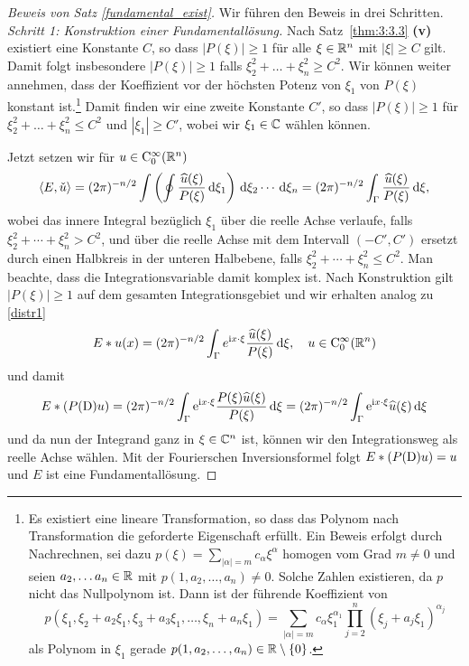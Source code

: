 \begin{proof}[Beweis von Satz \ref{fundamental_exist}]
Wir führen den Beweis in drei Schritten.\\
\noindent
{\em Schritt 1: Konstruktion einer Fundamentallösung.}
Nach Satz~\ref{thm:3:3.3} {\bf (v)} existiert eine Konstante $C$, so dass $|P(\xi)|\ge 1$ für alle $\xi\in \mathbb R^n$ mit $|\xi|\ge C$ gilt.  Damit folgt insbesondere 
$|P(\xi)|\ge 1$ falls $\xi_2^2+ \dots + \xi_n^2 \ge C^2$.  
Wir können weiter annehmen, dass der Koeffizient vor der höchsten Potenz von $\xi_1$ von $P(\xi)$ konstant ist.\footnote{Es existiert eine lineare Transformation, so dass das Polynom nach Transformation die geforderte Eigenschaft erfüllt. Ein Beweis erfolgt durch Nachrechnen, sei dazu $p(\xi)=\sum_{|\alpha|=m}c_\alpha \xi^\alpha$ homogen vom Grad $m\ne0$ und seien $a_2,\ldots a_{n}\in\mathbb R$ mit  $p(1,a_2,\ldots,a_n)\ne0$. Solche Zahlen existieren, da $p$ nicht das Nullpolynom ist. Dann ist der führende Koeffizient von
\[ p(\xi_1, \xi_2+a_2\xi_1, \xi_3+a_3\xi_1,\ldots,\xi_{n}+a_n\xi_1) =\sum_{|\alpha|=m} c_\alpha \xi_1^{\alpha_1} \prod_{j=2}^n  (\xi_j+a_j\xi_1)^{\alpha_j} \]
als Polynom in $\xi_1$ gerade $p(1,a_2,\ldots,a_n)\in\mathbb R\setminus\{0\}$.}
Damit finden wir eine zweite Konstante $C'$, so dass $|P(\xi)|\ge 1$ für $\xi_2^2+\dots + \xi_n^2\le C^2$ und $|\xi_1|\ge C'$, wobei wir $\xi_1\in\mathbb C$ wählen können.  

Jetzt setzen wir für $u\in\mathrm C_0^\infty(\mathbb R^n)$
\begin{equation}\label{distr3}
\langle E, \check u\rangle  = (2\pi)^{-n/2} \int\left( \oint \frac{\widehat u(\xi)}{P(\xi)} \,\mathrm d\xi_1\right) \,\mathrm d\xi_2 \cdots \,\mathrm d\xi_n 
= (2\pi)^{-n/2} \int_\Gamma \frac{\widehat u(\xi)}{P(\xi)} \,\mathrm d \xi,
\end{equation}
wobei das innere Integral bezüglich $\xi_1$ über die reelle Achse verlaufe, falls $\xi_2^2+ \cdots + \xi_n^2 > C^2$, und über die reelle Achse mit dem Intervall $(-C', C')$ ersetzt durch einen Halbkreis in der unteren Halbebene, falls $\xi_2^2+ \cdots+ \xi_n^2 \le C^2$. Man beachte, dass die Integrationsvariable damit komplex ist.
Nach Konstruktion gilt $|P(\xi)|\ge 1$ auf dem gesamten Integrationsgebiet und wir erhalten analog zu \eqref{distr1}
\begin{equation}
E*u(x) = (2\pi)^{-n/2}\int_\Gamma e^{\mathrm i x\cdot \xi } \frac{\widehat u(\xi)}{P(\xi)}\,\mathrm d \xi, \quad u \in \mathrm C_0^\infty(\mathbb R^n)
\end{equation} 
und damit 
\begin{equation}
E*(P(\mathrm D)u) = (2\pi)^{-n/2} \int_\Gamma \mathrm e^{\mathrm i x\cdot\xi}   \frac{P(\xi) \widehat{u} (\xi)}{P(\xi)}\,\mathrm d \xi=(2\pi)^{-n/2} \int_\Gamma \mathrm e^{\mathrm i x\cdot \xi} \widehat u(\xi) \,\mathrm d \xi
\end{equation}
und da nun der Integrand ganz in $\xi\in\mathbb C^n$ ist, können wir den Integrationsweg als reelle Achse wählen. Mit der Fourierschen Inversionsformel folgt
$E*(P(\mathrm D)u)=u$ und $E$ ist eine Fundamentallösung.


\end{proof}
